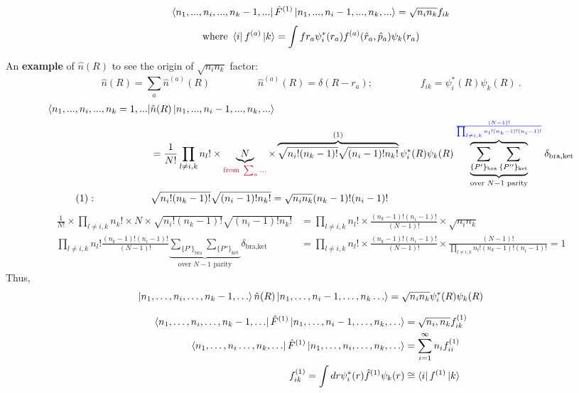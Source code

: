 \documentclass[10pt]{article}
\newcommand{\smallspace}{\hspace{2cm}}
\begin{document}
$$
\bra{n_1, ..., n_i, ..., n_k-1, ...}\hat F^{(1)} \ket{n_1, ..., n_i-1, ..., n_k,...} = \sqrt{n_i n_k}f_{ik}
$$
$$
\text{where} \ \bra{i}f^{(a)}\ket{k} = \int fr_a \psi_i^\ast(r_a)f^{(a)}(\hat r_a, \hat p_a) \psi_k(r_a)
$$
\par An \textbf{example} of $\hat n(R)$ to see the origin of $\sqrt{n_in_k}$ factor:
$$
\hat n(R) = \sum_a\hat n^{(a)}(R) \smallspace \hat n^{(a)}(R) = \delta(R - r_a); \smallspace f_{ik} = \psi^\ast_i(R)\psi_k(R) \ .
$$
\begin{align*}
    \bra{n_1, ..., n_i, ..., n_k=1, ...}&\hat n(R) \ket{n_1, ..., n_i-1, ...,n_k,...}\\
                                        &= \frac{1}{N!}\prod_{l \neq i, k} n_l! \times \underbrace{N}_{\textcolor{purple}{\text{from }\sum_a...}}\times \overbrace{\sqrt{n_i!(n_k-1)!}\sqrt{(n_i-1)!n_k!}}^{(1)}\psi^\ast_i(R)\psi_k(R) \overbrace{\underbrace{\sum_{\{P'\}_\text{bra}}\sum_{\{P''\}_\text{ket}}}_{\text{over }N-1\text{ parity}}}^{\textcolor{blue}{\frac{(N-1)!}{\prod_{l\neq i,k}n_l!(n_k-1)!(n_i-1)!}}}\delta_{\text{bra},\text{ket}}\\
    (1): \smallspace & \sqrt{n_i!(n_k-1)!}\sqrt{(n_i-1)!n_k!} = \sqrt{n_in_k}(n_k-1)!(n_i-1)!\\
\end{align*}
\begin{align*}
                    \frac{1}{N!} \times \prod_{l\neq i,k}n_k! \times N \times \sqrt{n_i!(n_k-1)!}\sqrt{(n_i-1)!n_k!} &= \prod_{l\neq i,k} n_l! \times \frac{(n_k-1)!(n_i-1)!}{(N-1)!} \times \sqrt{n_in_k}\\
                    \prod_{l\neq i,k} n_l! \frac{(n_k-1)!(n_i-1)!}{(N-1)!} \underbrace{\sum_{\{P'\}_\text{bra}}\sum_{\{P''\}_\text{ket}}}_{\text{over }N-1\text{ parity}}\delta_{\text{bra},\text{ket}} &= \prod_{l\neq i,k}n_l! \times \frac{(n_k-1)!(n_i-1)!}{(N-1)!}\times \frac{(N-1)!}{\prod_{l\neq i,k}n_l!(n_k-1)!(n_i-1)!} = 1
\end{align*}
Thus,
$$
\ket{n_1,\dots,n_i,\dots,n_k-1,\dots}\hat n(R) \ket{n_1,\dots,n_i-1,\dots,n_k\dots} = \sqrt{n_in_k} \psi_i^\ast(R)\psi_k(R)
$$
\begin{tcolorbox}[colback=white,colframe=red]
    \begin{align*}
    \bra{n_1,\dots,n_i,\dots,n_k-1,\dots}\hat F^{(1)} \ket{n_1,\dots,n_i-1,\dots, n_k,\dots} &= \sqrt{n_i, n_k}f_{ik}^{(1)} \\
    \bra{n_1, \dots, n_i \dots, n_k, \dots}\hat F^{(1)} \ket{n_1,\dots,n_i,\dots,n_k,\dots} &= \sum_{i=1}^\infty n_i f_{ii}^{(1)} \\
    f_{ik}^{(1)} = \int dr \psi_i^\ast(r) \hat f^{(1)}\psi_k(r) &\cong \bra{i}f^{(1)}\ket{k}
    \end{align*}
\end{tcolorbox}
\end{document}
